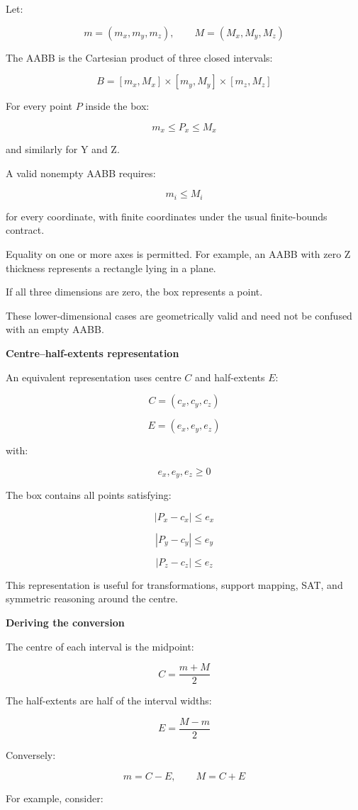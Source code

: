 Let:

\[
m=(m_x,m_y,m_z),\qquad M=(M_x,M_y,M_z)
\]

The AABB is the Cartesian product of three closed intervals:

\[
\boxed{ B=[m_x,M_x]\times[m_y,M_y]\times[m_z,M_z] }
\]

For every point \(P\) inside the box:

\[
m_x\le P_x\le M_x
\]

and similarly for Y and Z.

A valid nonempty AABB requires:

\[
m_i\le M_i
\]

for every coordinate, with finite coordinates under the usual finite-bounds contract.

Equality on one or more axes is permitted. For example, an AABB with zero Z thickness represents a rectangle lying in a plane.

If all three dimensions are zero, the box represents a point.

These lower-dimensional cases are geometrically valid and need not be confused with an empty AABB.

\textbf{Centre--half-extents representation}

An equivalent representation uses centre \(C\) and half-extents \(E\):

\[
C=(c_x,c_y,c_z)
\]

\[
E=(e_x,e_y,e_z)
\]

with:

\[
e_x,e_y,e_z\ge0
\]

The box contains all points satisfying:

\[
|P_x-c_x|\le e_x
\]

\[
|P_y-c_y|\le e_y
\]

\[
|P_z-c_z|\le e_z
\]

This representation is useful for transformations, support mapping, SAT, and symmetric reasoning around the centre.

\textbf{Deriving the conversion}

The centre of each interval is the midpoint:

\[
\boxed{C=\frac{m+M}{2}}
\]

The half-extents are half of the interval widths:

\[
\boxed{E=\frac{M-m}{2}}
\]

Conversely:

\[
\boxed{m=C-E,\qquad M=C+E}
\]

For example, consider:

